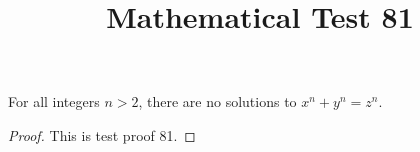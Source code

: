 \documentclass{amsart}
\begin{document}
\title{Mathematical Test 81}
\begin{theorem}
For all integers $n > 2$, there are no solutions to $x^n + y^n = z^n$.
\end{theorem}
\begin{proof}
This is test proof 81.
\end{proof}
\end{document}
